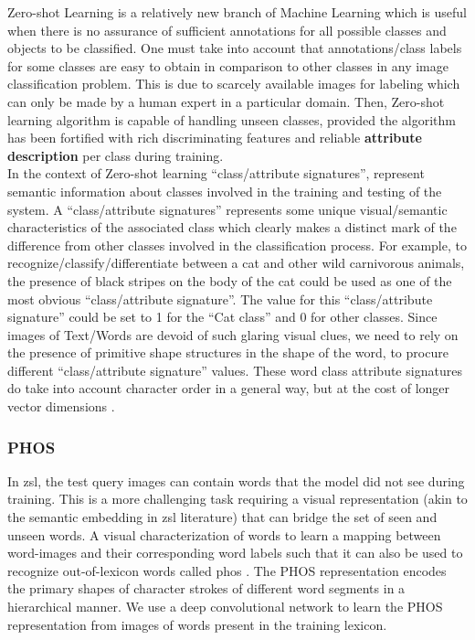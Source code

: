 Zero-shot Learning is a relatively new branch of Machine Learning which is useful when there is no assurance of sufficient annotations for all possible classes and objects to be classified. One must take into account that annotations/class labels for some classes are easy to obtain in comparison to other classes in any image classification problem. This is due to scarcely available images for labeling which can only be made by a human expert in a particular domain. Then, Zero-shot learning algorithm is capable of handling unseen classes, provided the algorithm has been fortified with rich discriminating features and reliable \textbf{attribute description} per class during training. \\

In the context of Zero-shot learning “class/attribute signatures”, represent semantic information about classes involved in the training and testing of the system. A “class/attribute signatures” represents some unique visual/semantic characteristics of the associated class which clearly makes a distinct mark of the difference from other classes involved in the classification process. For example, to recognize/classify/differentiate between a cat and other wild carnivorous animals, the presence of black stripes on the body of the cat could be used as one of the most obvious “class/attribute signature”. The value for this “class/attribute signature” could be set to 1 for the “Cat class” and 0 for other classes. Since images of Text/Words are devoid of such glaring visual clues, we need to rely on the presence of primitive shape structures in the shape of the word, to procure different “class/attribute signature” values. These word class attribute signatures do take into account character order in a general way, but at the cost of longer vector dimensions \cite{ZEROSHOT}.

\subsubsection{PHOS}
In \acrfull{zsl}, the test query images can contain words that the model did not see during training. This is a more challenging task requiring a visual representation (akin to the semantic embedding in \acrshort{zsl} literature) that can bridge the set of seen and unseen words. A visual characterization of words to learn a mapping between word-images and their corresponding word labels such that it can also be used to recognize out-of-lexicon words called \acrfull{phos} \cite{PHOSC}. The PHOS representation encodes the primary shapes of character strokes of different word segments in a hierarchical manner. We use a deep convolutional network to learn the PHOS representation from images of words present in the training lexicon. \\

